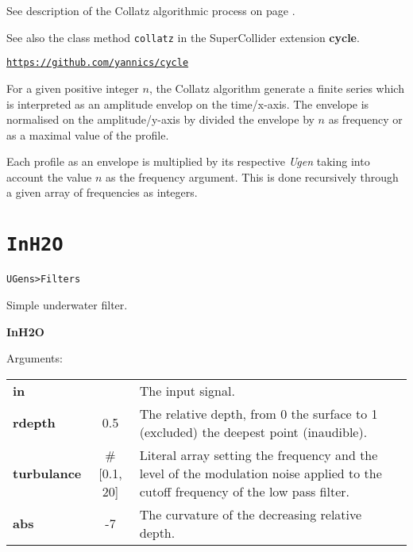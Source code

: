 See description of the Collatz algorithmic process on page \pageref{colres}. 

See also the class method \texttt{collatz} in the SuperCollider extension \textbf{cycle}. %

\href{https://github.com/yannics/cl-mst}{\texttt{\small https://github.com/yannics/cycle}}

\bigskip
For a given positive integer $n$, the Collatz algorithm generate a finite series which is interpreted as an amplitude envelop on the time/x-axis. The envelope is normalised on the amplitude/y-axis by divided the envelope by $n$ as frequency or as a maximal value of the profile. 

\bigskip

Each profile as an envelope is multiplied by its respective \textit{Ugen} taking into account the value $n$ as the frequency argument. This is done recursively through a given array of frequencies as integers.


\section{\texttt{InH2O}}
\label{inh2o}

\texttt{UGens>Filters}

\bigskip

Simple underwater filter.


\bigskip
\begin{addmargin}[1em]{0em}%
\begin{mdframed}[style=mystyle]

\bigskip

{\large \textbf{InH2O}}

\hrulefill

\color{gray!80}Arguments:\color{black} 

\bigskip

\begin{tabular}{l c p{6cm}}
\textbf{in} &  & The input signal.\\
\textbf{rdepth} & 0.5 & The relative depth, from 0 the surface to 1 (excluded) the deepest point (inaudible).\\
\textbf{turbulance} & \#[0.1, 20] &  Literal array setting the frequency and the level of the modulation noise applied to the cutoff frequency of the low pass filter.\\
\textbf{abs} & -7 & The curvature of the decreasing relative depth.
\end{tabular}

\bigskip

\end{mdframed}
\end{addmargin}

